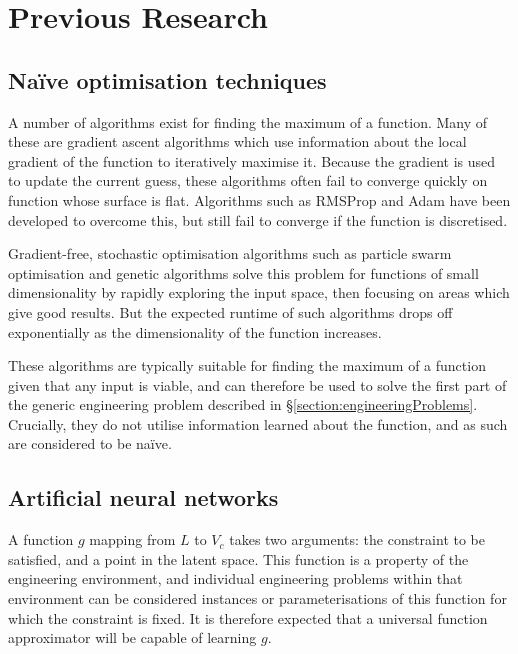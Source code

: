 \documentclass[../../main.tex]{subfiles}
\begin{document}
\chapter{Previous Research} \label{chapter:previousResearch}

\section{Na\"{i}ve optimisation techniques} \label{section:naiveOptimisationTechniques}

A number of algorithms exist for finding the maximum of a function.
Many of these are gradient ascent algorithms \cite{ruder17} which use information about the local gradient of the function to iteratively maximise it.
Because the gradient is used to update the current guess, these algorithms often fail to converge quickly on function whose surface is flat.
Algorithms such as RMSProp \cite{hinton17} and Adam \cite{kingma17} have been developed to overcome this, but still fail to converge if the function is discretised.

Gradient-free, stochastic optimisation algorithms such as particle swarm optimisation \cite{kennedy12} and genetic algorithms \cite{carr14} solve this problem for functions of small dimensionality by rapidly exploring the input space, then focusing on areas which give good results.
But the expected runtime of such algorithms drops off exponentially as the dimensionality of the function increases.

These algorithms are typically suitable for finding the maximum of a function given that any input is viable, and can therefore be used to solve the first part of the generic engineering problem described in \S\ref{section:engineeringProblems}.
Crucially, they do not utilise information learned about the function, and as such are considered to be na\"{i}ve.

\section{Artificial neural networks} \label{section:artificialNeuralNetworks}

A function $g$ mapping from $L$ to $V_c$ takes two arguments: the constraint to be satisfied, and a point in the latent space.
This function is a property of the engineering environment, and individual engineering problems within that environment can be considered instances or parameterisations of this function for which the constraint is fixed.
It is therefore expected that a universal function approximator will be capable of learning $g$.
\end{document}
